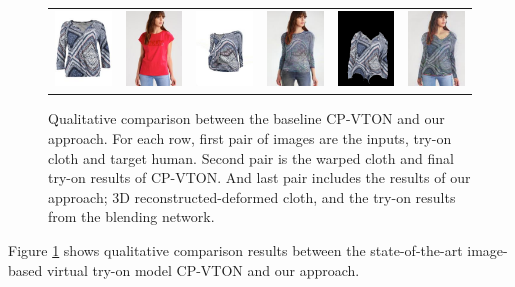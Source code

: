 \begin{figure}[t]
\begin{tabular}{cc|cc|cc}
\includegraphics[width=2cm]{figures/cloth/016962_1.jpg}&
\includegraphics[width=2cm]{figures/image/019402_0.jpg}&
\includegraphics[width=2cm]{figures/cp-vton/warp-cloth/016962_1_019402_0.jpg}&
\includegraphics[width=2cm]{figures/cp-vton/try-on/016962_1_019402_0.jpg}&
\includegraphics[width=2cm]{figures/c3dwfull/016962_1_019402_0.png}&
\includegraphics[width=2cm]{figures/try-on/016962_1_019402_0.jpg}\\

\end{tabular}

    \caption{Qualitative comparison between the baseline CP-VTON\cite{Wang2018TowardCI} and our approach. For each row, first pair of images are the inputs, try-on cloth and target human. Second pair is the warped cloth and final try-on results of CP-VTON\cite{Wang2018TowardCI}. And last pair includes the results of our approach; 3D reconstructed-deformed cloth, and the try-on results from the blending network.}
    \label{fig:testresults}
\end{figure}




Figure \ref{fig:testresults} shows qualitative comparison results between the state-of-the-art image-based virtual try-on model CP-VTON\cite{Wang2018TowardCI} and our approach.